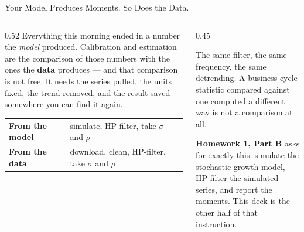 \begin{frame}{Your Model Produces Moments. So Does the Data.}
\begin{columns}[T]
\begin{column}{0.52\textwidth}
\small
Everything this morning ended in a number the \emph{model} produced. Calibration and estimation are the comparison of those numbers with the ones the \textbf{data} produces --- and that comparison is not free. It needs the series pulled, the units fixed, the trend removed, and the result saved somewhere you can find it again.
\medskip

\begin{center}\footnotesize
\begin{tabularx}{\linewidth}{@{}>{\raggedright\arraybackslash}p{2.5cm} >{\raggedright\arraybackslash}X@{}}
\toprule
\textbf{From the model} & simulate, HP-filter, take $\sigma$ and $\rho$ \\
\textbf{From the data} & download, clean, HP-filter, take $\sigma$ and $\rho$ \\
\bottomrule
\end{tabularx}
\end{center}
\end{column}
\begin{column}{0.45\textwidth}
\begin{conceptbox}[title=\textbf{The two halves must match}]\small
The same filter, the same frequency, the same detrending. A business-cycle statistic compared against one computed a different way is not a comparison at all.
\end{conceptbox}
\medskip
\begin{examplebox}\footnotesize
\textbf{Homework 1, Part B} asks for exactly this: simulate the stochastic growth model, HP-filter the simulated series, and report the moments. This deck is the other half of that instruction.
\end{examplebox}
\end{column}
\end{columns}
\end{frame}

